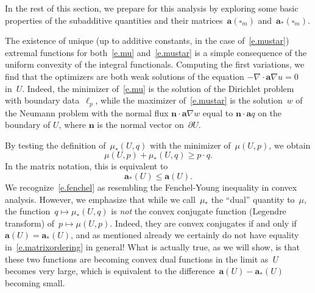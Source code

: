 \documentclass[11pt]{article} %
\let\oldsquare\square %
\renewcommand{\square}{\oldsquare}
\numberwithin{equation}{section}
\theoremstyle{definition}
\renewcommand{\a}{\mathbf{a}}
\newcommand{\cu}{\square}
\begin{document}
\smallskip

In the rest of this section, we prepare for this analysis by exploring some basic properties of the subadditive quantities and their matrices~$\a(\cu_m)$ and~$\a_*(\cu_m)$.

\smallskip

The existence of unique (up to additive constants, in the case of~\eqref{e.mustar}) extremal functions for both~\eqref{e.mu} and~\eqref{e.mustar} is a simple consequence of the uniform convexity of the integral functionals. Computing the first variations, we find that the optimizers are both weak solutions of the equation $-\nabla \cdot \a \nabla u=0$ in~$U$. Indeed, the minimizer of~\eqref{e.mu} is the solution of the Dirichlet problem with boundary data~$\ell_p$, while the maximizer of~\eqref{e.mustar} is the solution~$w$ of the Neumann problem with the normal flux $\mathbf{n} \cdot \a\nabla w$ equal to $\mathbf{n} \cdot \a q$ on the boundary of $U$, where $\mathbf{n}$ is the normal vector on~$\partial U$.   

\smallskip

By testing the definition of~$\mu_*(U,q)$ with the minimizer of~$\mu(U,p)$, we obtain
\begin{equation}
\label{e.fenchel}
\mu(U,p) + \mu_*(U,q) \geq p\cdot q. 
\end{equation}
In the matrix notation, this is equivalent to 
\begin{equation}
\label{e.matrixordering}
\a_*(U) \leq \a(U) .
\end{equation}
We recognize~\eqref{e.fenchel} as resembling the Fenchel-Young inequality in convex analysis. 
However, we emphasize that while we call~$\mu_*$ the ``dual'' quantity to~$\mu$, the function~$q\mapsto \mu_*(U,q)$ is \emph{not} the convex conjugate function (Legendre transform)  of~$p \mapsto \mu(U,p)$. Indeed, they are convex conjugates if and only if~$\a(U) = \a_*(U)$, and as mentioned already we certainly do not have equality in~\eqref{e.matrixordering} in general! What is actually true, as we will show, is that these two functions are becoming convex dual functions in the limit as~$U$ becomes very large, which is equivalent to the difference~$\a(U) - \a_*(U)$ becoming small. 

\smallskip
\end{document}
